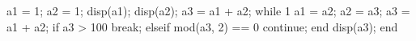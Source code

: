 a1 = 1; a2 = 1;
disp(a1); disp(a2);
a3 = a1 + a2;
while 1
    a1 = a2;
    a2 = a3;
    a3 = a1 + a2;
    if a3 > 100
        break;
    elseif mod(a3, 2) == 0
        continue;
    end
    disp(a3);
end
